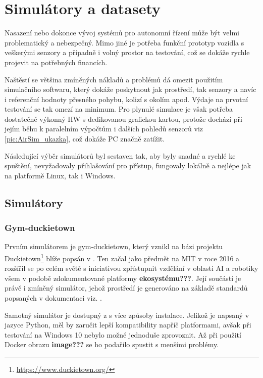 \documentclass[czech, bc, kky, he, iso690alph]{fasthesis}
\begin{document}
    \chapter{Simulátory a datasety}
    	Nasazení nebo dokonce vývoj systémů pro autonomní řízení může být velmi problematický a nebezpečný. Mimo jiné je potřeba funkční prototyp vozidla s veškerými senzory a případně i volný prostor na testování, což se dokáže rychle projevit na potřebných financích.
    	
    	Naštěstí se většina zmíněných nákladů a problémů dá omezit použitím simulačního softwaru, který dokáže poskytnout jak prostředí, tak senzory a navíc i referenční hodnoty přesného pohybu, kolizí s okolím apod. Výdaje na prvotní testování se tak omezí na minimum. Pro plynulé simulace je však potřeba dostatečně výkonný HW s dedikovanou grafickou kartou, protože dochází při jejím běhu k paralelním výpočtům i dalších pohledů senzorů viz \ref{pic:AirSim_ukazka}, což dokáže PC značně zatížit.
    	
    	Následující výběr simulátorů byl sestaven tak, aby byly snadné a rychlé ke spuštění, nevyžadovaly přihlašování pro přístup, fungovaly lokálně a nejlépe jak na platformě Linux, tak i Windows.
    	\section{Simulátory}
    		\subsection{Gym-duckietown}
    			Prvním simulátorem je gym-duckietown, který vznikl na bázi projektu Duckietown\footnote{\href{https://www.duckietown.org/}{https://www.duckietown.org/}} blíže popsán v \cite{Duckietown}. Ten začal jako předmět na MIT v roce 2016 a rozšířil se po celém světě s iniciativou zpřístupnit vzdělání v oblasti AI a robotiky všem v podobě zdokumentované platformy \textbf{ekosystému???}. Její součástí je právě i zmíněný simulátor, jehož prostředí je generováno na základě standardů popsaných v dokumentaci viz. \cite{duckietown_documentation}.
    			
    			Samotný simulátor je dostupný z \cite{gym_duckietown} s více způsoby instalace. Jelikož je napsaný v jazyce Python, měl by zaručit lepší kompatibility napříč platformami, avšak při testování na Windows 10 nebylo možné jednoduše zprovoznit. Až při použití Docker obrazu \textbf{image???} se ho podařilo spustit s menšími problémy.
    			
\end{document}
